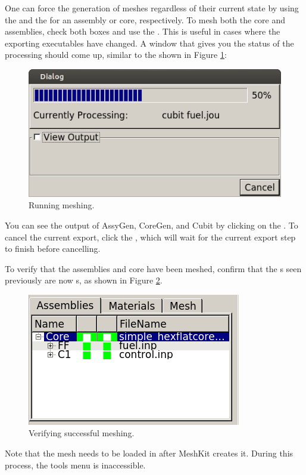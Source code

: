 One can force the generation of meshes regardless of their current state by using the  and the  for an assembly or core, respectively.  To mesh both the core and assemblies, check both boxes and use the .  This is useful in cases where the exporting executables have changed.  A window that gives you the status of the processing should come up, similar to the shown in Figure \ref{fig:Mesh5}:

\begin{figure}[H]
	\begin{center}
		\includegraphics[width=0.5\linewidth]{Images/mesh-5.png}
		\caption{Running meshing.}
		\label{fig:Mesh5}
	\end{center}
\end{figure}

You can see the output of AssyGen, CoreGen, and Cubit by clicking on the .  To cancel the current export, click the , which will wait for the current export step to finish before cancelling.

To verify that the assemblies and core have been meshed, confirm that the s seen previously are now s, as shown in Figure \ref{fig:Mesh6}.

\begin{figure}[H]
	\begin{center}
		\includegraphics[width=0.5\linewidth]{Images/mesh-6.png}
		\caption{Verifying successful meshing.}
		\label{fig:Mesh6}
	\end{center}
\end{figure}

Note that the mesh needs to be loaded in after MeshKit creates it.  During this process, the tools menu is inaccessible.